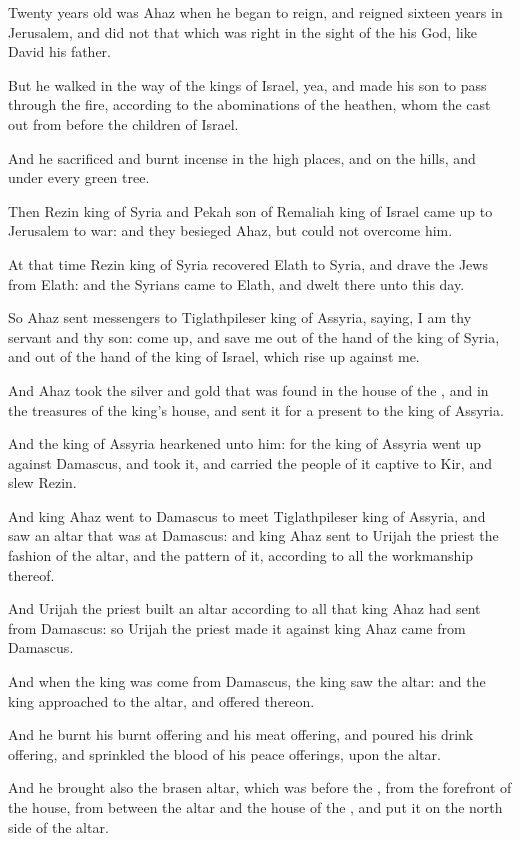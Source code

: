 \verse Twenty years old was Ahaz when he began to reign, and reigned sixteen years in Jerusalem, and did not that which was right in the sight of the \LORD his God, like David his father.

\verse But he walked in the way of the kings of Israel, yea, and made his son to pass through the fire, according to the abominations of the heathen, whom the \LORD cast out from before the children of Israel.

\verse And he sacrificed and burnt incense in the high places, and on the hills, and under every green tree.

\verse Then Rezin king of Syria and Pekah son of Remaliah king of Israel came up to Jerusalem to war: and they besieged Ahaz, but could not overcome him.

\verse At that time Rezin king of Syria recovered Elath to Syria, and drave the Jews from Elath: and the Syrians came to Elath, and dwelt there unto this day.

\verse So Ahaz sent messengers to Tiglathpileser king of Assyria, saying, I am thy servant and thy son: come up, and save me out of the hand of the king of Syria, and out of the hand of the king of Israel, which rise up against me.

\verse And Ahaz took the silver and gold that was found in the house of the \LORD, and in the treasures of the king's house, and sent it for a present to the king of Assyria.

\verse And the king of Assyria hearkened unto him: for the king of Assyria went up against Damascus, and took it, and carried the people of it captive to Kir, and slew Rezin.

\verse And king Ahaz went to Damascus to meet Tiglathpileser king of Assyria, and saw an altar that was at Damascus: and king Ahaz sent to Urijah the priest the fashion of the altar, and the pattern of it, according to all the workmanship thereof.

\verse And Urijah the priest built an altar according to all that king Ahaz had sent from Damascus: so Urijah the priest made it against king Ahaz came from Damascus.

\verse And when the king was come from Damascus, the king saw the altar: and the king approached to the altar, and offered thereon.

\verse And he burnt his burnt offering and his meat offering, and poured his drink offering, and sprinkled the blood of his peace offerings, upon the altar.

\verse And he brought also the brasen altar, which was before the \LORD, from the forefront of the house, from between the altar and the house of the \LORD, and put it on the north side of the altar.

